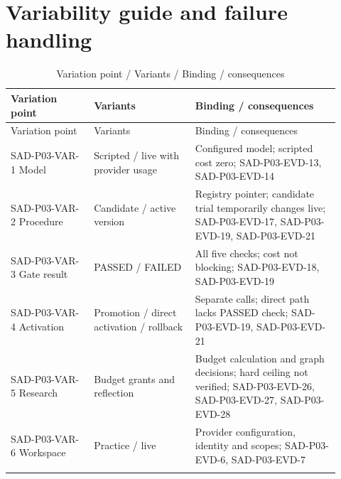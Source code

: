 \documentclass[10pt,letterpaper]{article}
\begin{document}
\section{Variability guide and failure handling}
\begin{longtable}{@{}>{\raggedright\arraybackslash}p{0.23\linewidth}>{\raggedright\arraybackslash}p{0.29\linewidth}>{\raggedright\arraybackslash}p{0.4\linewidth}@{}}
\caption{Variation point / Variants / Binding / consequences}\\
\toprule Variation point & Variants & Binding / consequences\\\midrule\endfirsthead
\toprule Variation point & Variants & Binding / consequences\\\midrule\endhead
SAD-P03-VAR-1 Model & Scripted / live with provider usage & Configured model; scripted cost zero; SAD-P03-EVD-13, SAD-P03-EVD-14\\\addlinespace
SAD-P03-VAR-2 Procedure & Candidate / active version & Registry pointer; candidate trial temporarily changes live; SAD-P03-EVD-17, SAD-P03-EVD-19, SAD-P03-EVD-21\\\addlinespace
SAD-P03-VAR-3 Gate result & PASSED / FAILED & All five checks; cost not blocking; SAD-P03-EVD-18, SAD-P03-EVD-19\\\addlinespace
SAD-P03-VAR-4 Activation & Promotion / direct activation / rollback & Separate calls; direct path lacks PASSED check; SAD-P03-EVD-19, SAD-P03-EVD-21\\\addlinespace
SAD-P03-VAR-5 Research & Budget grants and reflection & Budget calculation and graph decisions; hard ceiling not verified; SAD-P03-EVD-26, SAD-P03-EVD-27, SAD-P03-EVD-28\\\addlinespace
SAD-P03-VAR-6 Workspace & Practice / live & Provider configuration, identity and scopes; SAD-P03-EVD-6, SAD-P03-EVD-7\\\addlinespace
\bottomrule\end{longtable}
\end{document}
